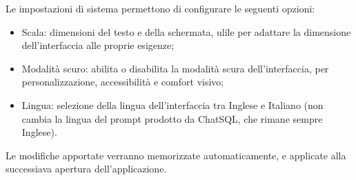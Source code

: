 \par Le impostazioni di sistema permettono di configurare le seguenti opzioni:
\begin{itemize}
  \item Scala: dimensioni del testo e della schermata, ulile per adattare la dimensione dell'interfaccia alle proprie esigenze;
  \item Modalità scuro: abilita o disabilita la modalità scura dell'interfaccia, per personalizzazione, accessibilità e comfort visivo;
  \item Lingua: selezione della lingua dell'interfaccia tra Inglese e Italiano (non cambia la lingua del prompt prodotto da ChatSQL, che rimane sempre Inglese).
\end{itemize}
\par Le modifiche apportate verranno memorizzate automaticamente, e applicate alla successiava apertura dell'applicazione.